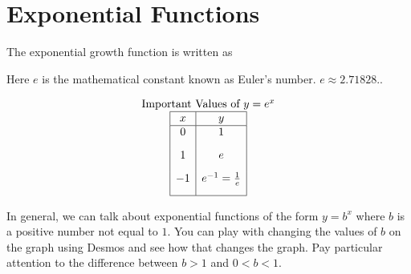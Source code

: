 \documentclass[nooutcomes]{ximera}
\begin{document}
\newpage


\section{Exponential Functions}
The exponential growth function is written as

\begin{image}
\end{image}

Here $e$ is the mathematical constant known as Euler's number.  $e \approx 2.71828 .$.

\begin{image}
\end{image}

\[
\begin{array}{c}
 \text{Important Values of $y=e^x$} \\
\begin{array}{|c|c|}
\hline
 x & y \\
 \hline 
 0&1\\[2ex]
 1&e\\[2ex]
 -1&e^{-1}=\frac{1}{e}\\[2ex]
\hline
\end{array}
\end{array}
 \]

In general, we can talk about exponential functions of the form $y=b^{x}$ where $b$ is a positive number not equal to $1$.  You can play with changing the values of $b$ on the graph using Desmos and see how that changes the graph.  Pay particular attention to the difference between $b>1$ and $0<b<1$.

\begin{center}  
\end{center}
\end{document}
